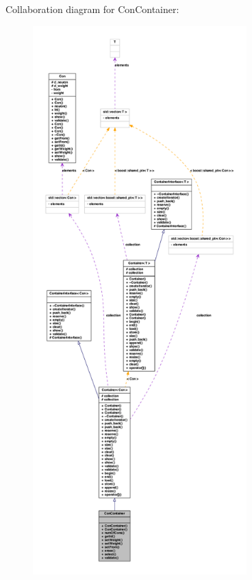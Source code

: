 Collaboration diagram for ConContainer:
\nopagebreak
\begin{figure}[H]
\begin{center}
\leavevmode
\includegraphics[height=600pt]{class_con_container__coll__graph}
\end{center}
\end{figure}
